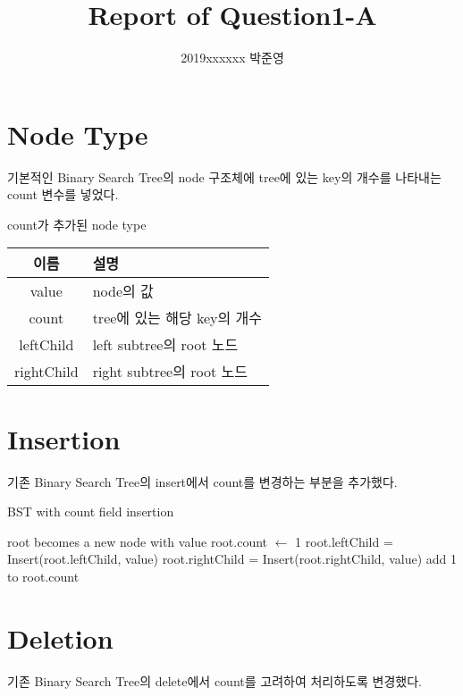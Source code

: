 \documentclass[a4paper, 11pt]{article}
\title{Report of Question1-A}
\author{2019xxxxxx 박준영}
\date{}
\begin{document}
\maketitle


\section{Node Type}
기본적인 Binary Search Tree의 node 구조체에 tree에 있는 key의 개수를 나타내는 count 변수를 넣었다.
\\

\begin{center}
	\begin{threeparttable}
		\caption{count가 추가된 node type}
		\begin{tabular}{|c|l|}
			\hline
			이름 & 설명\\
			\hline
			value & node의 값\\
			count & tree에 있는 해당 key의 개수\\
			leftChild & left subtree의 root 노드\\
			rightChild & right subtree의 root 노드\\
		\hline
		\end{tabular}
	\end{threeparttable}
\end{center}

\section{Insertion}
기존 Binary Search Tree의 insert에서 count를 변경하는 부분을 추가했다.
\\

\begin{algorithm}
	\caption{BST with count field insertion}
	\begin{algorithmic}
				\State root becomes a new node with value
				\State root.count $\gets$ 1
				\State root.leftChild = Insert(root.leftChild, value)
				\State root.rightChild = Insert(root.rightChild, value)
			\Else
				\State add 1 to root.count
			\EndIf
			
			\State {}
		\EndFunction
	\end{algorithmic}
\end{algorithm}
\pagebreak

\section{Deletion}
기존 Binary Search Tree의 delete에서 count를 고려하여 처리하도록 변경했다.
\\
\end{document}

